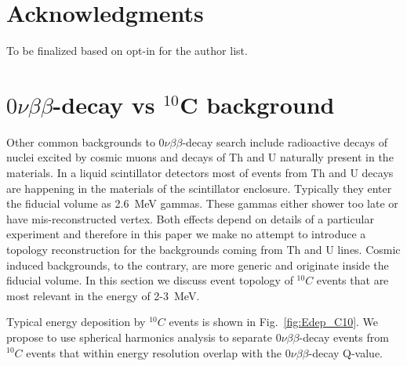 \documentclass[12pt,twoside,letterpaper]{article}
\newcommand{\vbb}{0\nu\beta\beta}
\newcommand{\Cten}{^{10}C}
\begin{document}
\section{Acknowledgments}
To be finalized based on opt-in for the author list.


\appendix

\section{$\vbb$-decay vs $^{10}$C background}

Other common backgrounds to $\vbb$-decay search include radioactive decays of nuclei excited by cosmic muons and decays of Th and U naturally present in the materials. In a liquid scintillator detectors most of events from Th and U decays are happening in the materials of the scintillator enclosure. Typically they enter the fiducial volume as 2.6~MeV gammas. These gammas either shower too late or have mis-reconstructed vertex. Both effects depend on details of a particular experiment and therefore in this paper we make no attempt to introduce a topology reconstruction for the backgrounds coming from Th and U lines. Cosmic induced backgrounds, to the contrary, are more generic and originate inside the fiducial volume. In this section we discuss event topology of $\Cten$ events that are most relevant in the energy of 2-3~MeV.

Typical energy deposition by $\Cten$ events is shown in Fig.~\ref{fig:Edep_C10}. We propose to use spherical harmonics analysis to separate $\vbb$-decay events from $\Cten$ events that within energy resolution overlap with the $\vbb$-decay Q-value.
\end{document}
